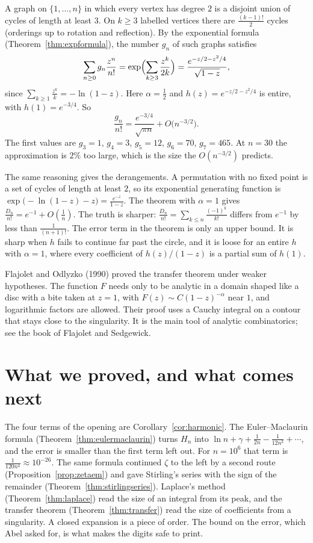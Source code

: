 \begin{example}\label{ex:tworegular}
A graph on $\{1,\dots,n\}$ in which every vertex has degree $2$ is a disjoint union of cycles of length at least $3$. On $k\ge3$ labelled vertices there
are $\frac{(k-1)!}2$ cycles (orderings up to rotation and reflection). By the exponential formula (Theorem~\ref{thm:expformula}), the number $g_n$ of such graphs
satisfies
\[
\sum_{n\ge0}g_n\frac{z^n}{n!}=\exp\Bigl(\sum_{k\ge3}\frac{z^k}{2k}\Bigr)=\frac{e^{-z/2-z^2/4}}{\sqrt{1-z}},
\]
since $\sum_{k\ge1}\frac{z^k}k=-\ln(1-z)$. Here $\alpha=\frac12$ and $h(z)=e^{-z/2-z^2/4}$ is entire, with $h(1)=e^{-3/4}$. So
\[
\frac{g_n}{n!}=\frac{e^{-3/4}}{\sqrt{\pi n}}+O\bigl(n^{-3/2}\bigr).
\]
The first values are $g_3=1$, $g_4=3$, $g_5=12$, $g_6=70$, $g_7=465$. At $n=30$ the approximation is $2\%$ too large, which is the size the $O(n^{-3/2})$ predicts.
\end{example}

The same reasoning gives the derangements. A permutation with no fixed point is a set of cycles of length at least $2$, so its exponential generating function is $\exp\bigl(-\ln(1-z)-z\bigr)=\frac{e^{-z}}{1-z}$. The theorem with $\alpha=1$ gives $\frac{D_n}{n!}=e^{-1}+O(\frac1n)$. The truth is sharper: $\frac{D_n}{n!}=\sum_{k\le n}\frac{(-1)^k}{k!}$ differs from $e^{-1}$ by less than $\frac1{(n+1)!}$. The error term in the theorem is only an upper bound. It is sharp when $h$ fails to continue far past the circle, and it is loose for an entire $h$ with $\alpha=1$, where every coefficient of $h(z)/(1-z)$ is a partial sum of $h(1)$.

\begin{remark}
Flajolet and Odlyzko (1990) proved the transfer theorem under weaker hypotheses. The function $F$ needs only to be analytic in a domain shaped like a disc with a bite taken at $z=1$, with $F(z)\sim C(1-z)^{-\alpha}$ near $1$, and logarithmic factors are allowed. Their proof uses a Cauchy integral on a contour that stays close to the singularity. It is the main tool of analytic combinatorics; see the book of Flajolet and Sedgewick.
\end{remark}

\section{What we proved, and what comes next}

The four terms of the opening are Corollary~\ref{cor:harmonic}. The Euler--Maclaurin formula (Theorem~\ref{thm:eulermaclaurin}) turns $H_n$ into $\ln n+\gamma+\frac1{2n}-\frac1{12n^2}+\cdots$, and the error is smaller than the first term left out. For $n=10^6$ that term is $\frac1{120n^4}\approx10^{-26}$. The same formula continued $\zeta$ to the left by a second route (Proposition~\ref{prop:zetaem}) and gave Stirling's series with the sign of the remainder (Theorem~\ref{thm:stirlingseries}). Laplace's method (Theorem~\ref{thm:laplace}) read the size of an integral from its peak, and the transfer theorem (Theorem~\ref{thm:transfer}) read the size of coefficients from a singularity. A closed expansion is a piece of order. The bound on the error, which Abel asked for, is what makes the digits safe to print.

